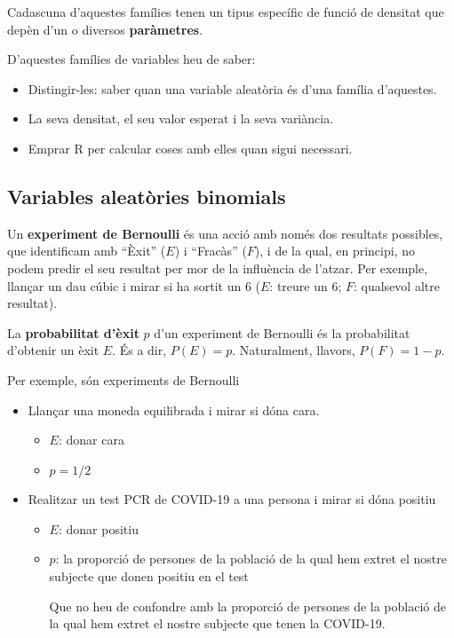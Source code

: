 \documentclass[
]{book}
\providecommand{\tightlist}{%
  \setlength{\itemsep}{0pt}\setlength{\parskip}{0pt}}
\theoremstyle{definition}
\theoremstyle{definition}
\theoremstyle{definition}
\theoremstyle{remark}
\begin{document}
Cadascuna d'aquestes famílies tenen un tipus específic de funció de densitat que depèn d'un o diversos \textbf{paràmetres}.

D'aquestes famílies de variables heu de saber:

\begin{itemize}
\tightlist
\item
  Distingir-les: saber quan una variable aleatòria és d'una família d'aquestes.
\item
  La seva densitat, el seu valor esperat i la seva variància.
\item
  Emprar R per calcular coses amb elles quan sigui necessari.
\end{itemize}

\hypertarget{variables-aleatuxf2ries-binomials}{%
\subsection{Variables aleatòries binomials}\label{variables-aleatuxf2ries-binomials}}

Un \textbf{experiment de Bernoulli} és una acció amb només dos resultats possibles, que identificam amb ``Èxit'' (\(E\)) i ``Fracàs'' (\(F\)), i de la qual, en principi, no podem predir el seu resultat per mor de la influència de l'atzar. Per exemple, llançar un dau cúbic i mirar si ha sortit un 6 (\(E\): treure un 6; \(F\): qualsevol altre resultat).

La \textbf{probabilitat d'èxit} \(p\) d'un experiment de Bernoulli és la probabilitat d'obtenir un èxit \(E\). És a dir, \(P(E)=p\). Naturalment, llavors, \(P(F)=1-p\).

Per exemple, són experiments de Bernoulli

\begin{itemize}
\item
  Llançar una moneda equilibrada i mirar si dóna cara.

  \begin{itemize}
  \tightlist
  \item
    \(E\): donar cara
  \item
    \(p=1/2\)
  \end{itemize}
\item
  Realitzar un test PCR de COVID-19 a una persona i mirar si dóna positiu

  \begin{itemize}
  \item
    \(E\): donar positiu
  \item
    \(p\): la proporció de persones de la població de la qual hem extret el nostre subjecte que donen positiu en el test

    Que no heu de confondre amb la proporció de persones de la població de la qual hem extret el nostre subjecte que tenen la COVID-19.
  \end{itemize}
\end{itemize}
\end{document}
